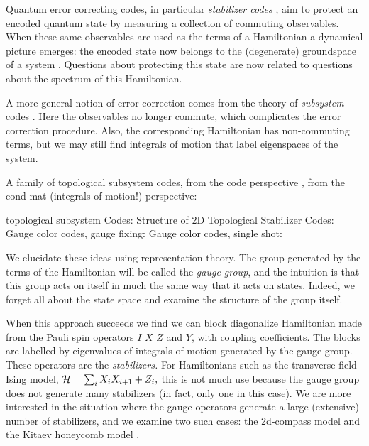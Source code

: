 \documentclass[12pt]{article}
\begin{document}


Quantum error correcting codes,
in particular {\it stabilizer codes} \cite{Gottesman1996,Calderbank1997},
aim to protect an encoded quantum state
by measuring a collection of commuting
observables.
When these same observables are used as
the terms of a Hamiltonian 
a dynamical picture emerges: the
encoded state now belongs to the
(degenerate) groundspace of a
system \cite{Dennis2001}. 
Questions about protecting
this state are now related to questions about
the spectrum of this Hamiltonian.

A more general notion of error correction
comes from the theory of 
{\it subsystem} codes \cite{Bacon2006,Poulin2005}. 
Here the observables
no longer commute, which complicates
the error correction procedure.
Also, the corresponding Hamiltonian
has non-commuting terms, but
we may still find integrals of
motion that label eigenspaces
of the system.

A family of topological subsystem codes,
from the code perspective  \cite{Bombin2010,Bombin2014,Suchara2011},
from the cond-mat (integrals of motion!) perspective:
\cite{Kargarian2010,Bombin2009}

topological subsystem Codes: \cite{Suchara2011}
Structure of 2D Topological Stabilizer Codes: \cite{Bombin2014}
Gauge color codes, gauge fixing: \cite{Bombin2015}
Gauge color codes, single shot: \cite{Bombin2015single}

We elucidate these ideas using representation theory. 
The group generated by the terms of the Hamiltonian
will be called the {\it gauge group},
and the intuition is that this
group acts on itself in much the same way
that it acts on states. 
Indeed, we forget all about the state space and
examine the structure of the group itself.

When this approach succeeds we find we can
block diagonalize Hamiltonian made from 
the Pauli spin operators
$I$ $X$ $Z$ and $Y$, with coupling coefficients.
The blocks are labelled by eigenvalues of
integrals of motion generated by the gauge
group. These operators are the {\it stabilizers.}
For Hamiltonians such as
the transverse-field Ising model,
$\mathcal{H} = \sum_i X_i X_{i+1} + Z_i,$
this is not much use because the 
gauge group does not generate many
stabilizers (in fact, only one in this case).
We are more interested in the situation
where the gauge operators generate a large 
(extensive) number of stabilizers, and we examine two
such cases: the 2d-compass model \cite{Bacon2006} and
the Kitaev honeycomb model \cite{Kitaev2006}.
\end{document}

